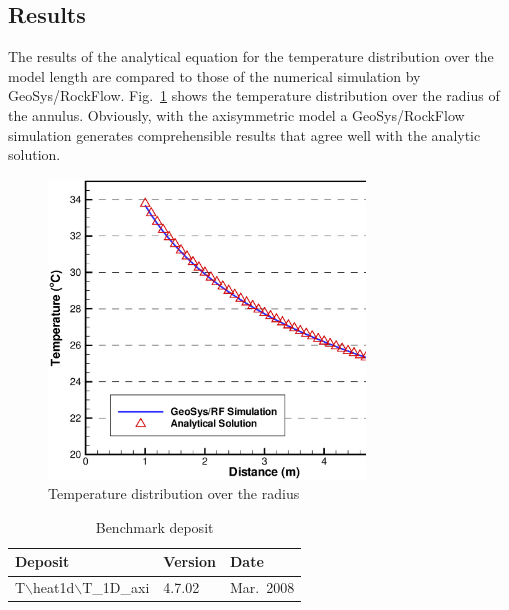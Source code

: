 \subsection{Results}

The results of the analytical equation for the temperature distribution over the model length are compared to those of the numerical simulation by GeoSys/RockFlow. Fig.~\ref{figT2} shows the temperature distribution over the radius of the annulus. Obviously, with the axisymmetric model a GeoSys/RockFlow simulation generates comprehensible results that agree well with the analytic solution.
\begin{figure}[htbp]
\centering
\includegraphics[width=0.75\textwidth]{T/figures/figT2.eps}
\caption{\label{figT2}Temperature distribution over the radius}
\end{figure}

\begin{table}[h]
\caption{Benchmark deposit}
\begin{center}
\begin{tabular}{lll}
\toprule
Deposit & Version & Date \\
\midrule
T$\backslash$heat1d$\backslash$T\_1D\_axi & 4.7.02 & Mar.~2008 \\
\bottomrule
\end{tabular}
\end{center}
\end{table}

